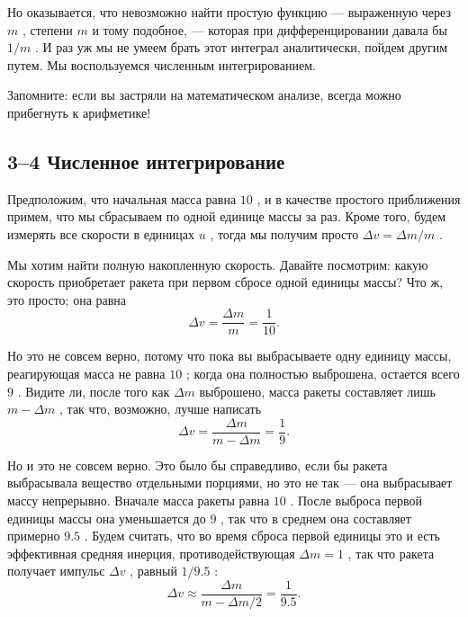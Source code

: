 \documentclass[11pt,oneside]{article}
\begin{document}
Но оказывается, что невозможно найти простую функцию --- выраженную через \(m\) , степени \(m\) и тому подобное, --- которая при дифференцировании давала бы \(1/m\) . И раз уж мы не умеем брать этот интеграл аналитически, пойдем другим путем. Мы воспользуемся численным интегрированием.\par

Запомните: если вы застряли на математическом анализе, всегда можно прибегнуть к арифметике!\par

\subsection*{3--4 Численное интегрирование}

Предположим, что начальная масса равна \(10\) , и в качестве простого приближения примем, что мы сбрасываем по одной единице массы за раз. Кроме того, будем измерять все скорости в единицах \(u\) , тогда мы получим просто \(\Delta v = \Delta m/m\) .\par

Мы хотим найти полную накопленную скорость. Давайте посмотрим: какую скорость приобретает ракета при первом сбросе одной единицы массы? Что ж, это просто; она равна 
\begin{equation*} \Delta v = \frac{\Delta m}{m} = \frac{1}{10}. \end{equation*}
\par

Но это не совсем верно, потому что пока вы выбрасываете одну единицу массы, реагирующая масса не равна \(10\) ; когда она полностью выброшена, остается всего \(9\) . Видите ли, после того как \(\Delta m\) выброшено, масса ракеты составляет лишь \(m - \Delta m\) , так что, возможно, лучше написать 
\begin{equation*} \Delta v = \frac{\Delta m}{m - \Delta m} = \frac{1}{9}. \end{equation*}
\par

Но и это не совсем верно. Это было бы справедливо, если бы ракета выбрасывала вещество отдельными порциями, но это не так --- она выбрасывает массу непрерывно. Вначале масса ракеты равна \(10\) . После выброса первой единицы массы она уменьшается до \(9\) , так что в среднем она составляет примерно \(9.5\) . Будем считать, что во время сброса первой единицы это и есть эффективная средняя инерция, противодействующая \(\Delta m = 1\) , так что ракета получает импульс \(\Delta v\) , равный \(1/9.5\) : 
\begin{equation*} \Delta v \approx \frac{\Delta m}{m - \Delta m/2} = \frac{1}{9.5}. \end{equation*}
\par
\end{document}
